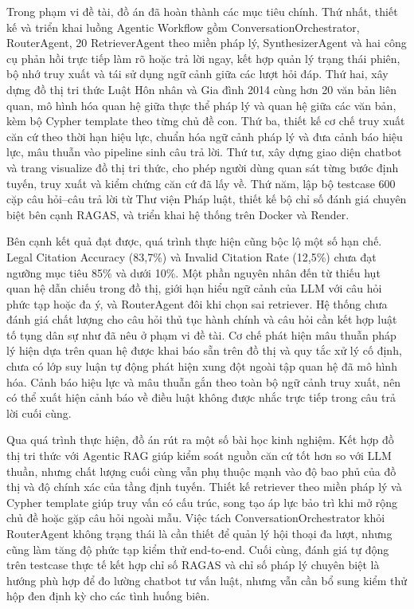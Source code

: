 \documentclass[../DoAn.tex]{subfiles}
\begin{document}
Trong phạm vi đề tài, đồ án đã hoàn thành các mục tiêu chính. Thứ nhất, thiết kế và triển khai luồng Agentic Workflow gồm ConversationOrchestrator, RouterAgent, 20 RetrieverAgent theo miền pháp lý, SynthesizerAgent và hai công cụ phản hồi trực tiếp làm rõ hoặc trả lời ngay, kết hợp quản lý trạng thái phiên, bộ nhớ truy xuất và tái sử dụng ngữ cảnh giữa các lượt hỏi đáp. Thứ hai, xây dựng đồ thị tri thức Luật Hôn nhân và Gia đình 2014 cùng hơn 20 văn bản liên quan, mô hình hóa quan hệ giữa thực thể pháp lý và quan hệ giữa các văn bản, kèm bộ Cypher template theo từng chủ đề con. Thứ ba, thiết kế cơ chế truy xuất căn cứ theo thời hạn hiệu lực, chuẩn hóa ngữ cảnh pháp lý và đưa cảnh báo hiệu lực, mâu thuẫn vào pipeline sinh câu trả lời. Thứ tư, xây dựng giao diện chatbot và trang visualize đồ thị tri thức, cho phép người dùng quan sát từng bước định tuyến, truy xuất và kiểm chứng căn cứ đã lấy về. Thứ năm, lập bộ testcase 600 cặp câu hỏi--câu trả lời từ Thư viện Pháp luật, thiết kế bộ chỉ số đánh giá chuyên biệt bên cạnh RAGAS, và triển khai hệ thống trên Docker và Render.

Bên cạnh kết quả đạt được, quá trình thực hiện cũng bộc lộ một số hạn chế. Legal Citation Accuracy (83,7\%) và Invalid Citation Rate (12,5\%) chưa đạt ngưỡng mục tiêu 85\% và dưới 10\%. Một phần nguyên nhân đến từ thiếu hụt quan hệ dẫn chiếu trong đồ thị, giới hạn hiểu ngữ cảnh của LLM với câu hỏi phức tạp hoặc đa ý, và RouterAgent đôi khi chọn sai retriever. Hệ thống chưa đánh giá chất lượng cho câu hỏi thủ tục hành chính và câu hỏi cần kết hợp luật tố tụng dân sự như đã nêu ở phạm vi đề tài. Cơ chế phát hiện mâu thuẫn pháp lý hiện dựa trên quan hệ được khai báo sẵn trên đồ thị và quy tắc xử lý cố định, chưa có lớp suy luận tự động phát hiện xung đột ngoài tập quan hệ đã mô hình hóa. Cảnh báo hiệu lực và mâu thuẫn gắn theo toàn bộ ngữ cảnh truy xuất, nên có thể xuất hiện cảnh báo về điều luật không được nhắc trực tiếp trong câu trả lời cuối cùng.

Qua quá trình thực hiện, đồ án rút ra một số bài học kinh nghiệm. Kết hợp đồ thị tri thức với Agentic RAG giúp kiểm soát nguồn căn cứ tốt hơn so với LLM thuần, nhưng chất lượng cuối cùng vẫn phụ thuộc mạnh vào độ bao phủ của đồ thị và độ chính xác của tầng định tuyến. Thiết kế retriever theo miền pháp lý và Cypher template giúp truy vấn có cấu trúc, song tạo áp lực bảo trì khi mở rộng chủ đề hoặc gặp câu hỏi ngoài mẫu. Việc tách ConversationOrchestrator khỏi RouterAgent không trạng thái là cần thiết để quản lý hội thoại đa lượt, nhưng cũng làm tăng độ phức tạp kiểm thử end-to-end. Cuối cùng, đánh giá tự động trên testcase thực tế kết hợp chỉ số RAGAS và chỉ số pháp lý chuyên biệt là hướng phù hợp để đo lường chatbot tư vấn luật, nhưng vẫn cần bổ sung kiểm thử hộp đen định kỳ cho các tình huống biên.
\end{document}
